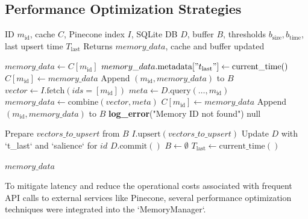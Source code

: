 \documentclass[conference]{IEEEtran}
\begin{document}
\subsection{Performance Optimization Strategies}

\begin{algorithm}[H]
\caption{LRU Cache With Batch Upsert to Pinecone}
\label{alg:lru_batch_upsert}
\begin{algorithmic}[1]
\Require ID $m_{\text{id}}$, cache $C$, Pinecone index $I$, SQLite DB $D$, buffer $B$, thresholds $b_{\text{size}}, b_{\text{time}}$, last upsert time $T_{\text{last}}$
\Ensure Returns $memory\_data$, cache and buffer updated

    \State $memory\_data \leftarrow C[m_{\text{id}}]$
    \State $memory\_data.\text{metadata}["t_{\text{last}}"] \leftarrow \text{current\_time}()$
    \State $C[m_{\text{id}}] \leftarrow memory\_data$
    \State Append $(m_{\text{id}}, memory\_data)$ to $B$
\Else
    \State $vector \leftarrow I.\text{fetch}(ids = [m_{\text{id}}])$
    \State $meta \leftarrow D.\text{query}(\dots, m_{\text{id}})$
        \State $memory\_data \leftarrow \text{combine}(vector, meta)$
        \State $C[m_{\text{id}}] \leftarrow memory\_data$
        \State Append $(m_{\text{id}}, memory\_data)$ to $B$
    \Else
        \State \textbf{log\_error}("Memory ID not found")
        \State \Return null
    \EndIf
\EndIf

        \State Prepare $vectors\_to\_upsert$ from $B$
        \State $I.\text{upsert}(vectors\_to\_upsert)$
            \State Update $D$ with `t\_last` and `salience` for $id$
        \EndFor
        \State $D.\text{commit}()$
        \State $B \leftarrow \emptyset$
        \State $T_{\text{last}} \leftarrow \text{current\_time}()$
    \EndIf
\EndIf

\State \Return $memory\_data$
\end{algorithmic}
\end{algorithm}


To mitigate latency and reduce the operational costs associated with frequent API calls to external services like Pinecone, several performance optimization techniques were integrated into the `MemoryManager`.
\end{document}
